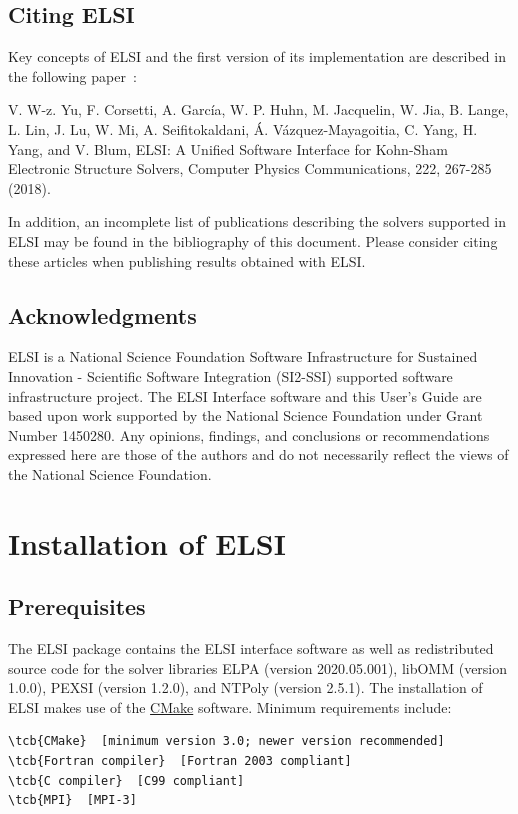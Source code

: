 \documentclass{report}
\newcommand{\tcb}[1]{\textcolor{blue}{#1}}
\begin{document}
\section{Citing ELSI}
\label{sec:cite}
Key concepts of ELSI and the first version of its implementation are described in the following paper~\cite{elsi_yu_2018}:

V. W-z. Yu, F. Corsetti, A. Garc\'{i}a, W. P. Huhn, M. Jacquelin, W. Jia, B. Lange, L. Lin, J. Lu, W. Mi, A. Seifitokaldani, \'{A}. V\'{a}zquez-Mayagoitia, C. Yang, H. Yang, and V. Blum, ELSI: A Unified Software Interface for Kohn-Sham Electronic Structure Solvers, Computer Physics Communications, 222, 267-285 (2018).

In addition, an incomplete list of publications describing the solvers supported in ELSI may be found in the bibliography of this document. Please consider citing these articles when publishing results obtained with ELSI.

\section{Acknowledgments}
\label{sec:thanks}
ELSI is a National Science Foundation Software Infrastructure for Sustained Innovation - Scientific Software Integration (SI2-SSI) supported software infrastructure project. The ELSI Interface software and this User's Guide are based upon work supported by the National Science Foundation under Grant Number 1450280. Any opinions, findings, and conclusions or recommendations expressed here are those of the authors and do not necessarily reflect the views of the National Science Foundation.

\chapter{Installation of ELSI}
\section{Prerequisites}
\label{sec:prereq}
The ELSI package contains the ELSI interface software as well as redistributed source code for the solver libraries ELPA (version 2020.05.001), libOMM (version 1.0.0), PEXSI (version 1.2.0), and NTPoly (version 2.5.1). The installation of ELSI makes use of the \href{https://cmake.org}{CMake} software. Minimum requirements include:
\begin{Verbatim}[commandchars=\\\{\}]
\tcb{CMake}  [minimum version 3.0; newer version recommended]
\tcb{Fortran compiler}  [Fortran 2003 compliant]
\tcb{C compiler}  [C99 compliant]
\tcb{MPI}  [MPI-3]
\end{Verbatim}
\end{document}

